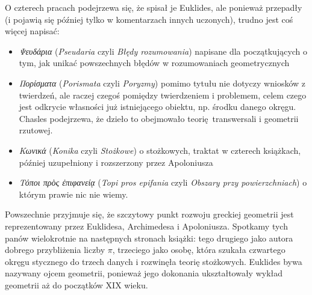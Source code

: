 O czterech pracach podejrzewa się, że spisał je Euklides, ale ponieważ przepadły (i pojawią się później tylko w komentarzach innych uczonych), trudno jest coś więcej napisać:
\begin{itemize}
\item \emph{Ψευδάρια} (\emph{Pseudaria} czyli \emph{Błędy rozumowania}) napisane dla początkujących o tym, jak unikać powszechnych błędów w rozumowaniach geometrycznych
\item \emph{Πορίσματα} (\emph{Porismata} czyli \emph{Poryzmy}) pomimo tytułu nie dotyczy wniosków z twierdzeń, ale raczej czegoś pomiędzy twierdzeniem i problemem, celem czego jest odkrycie własności już istniejącego obiektu, np. środku danego okręgu.
Chasles podejrzewa, że dzieło to obejmowało teorię transwersali i geometrii rzutowej.
%
\item \emph{Κωνικά} (\emph{Konika} czyli \emph{Stożkowe}) o stożkowych, traktat w czterech książkach, później uzupełniony i rozszerzony przez Apoloniusza
\item \emph{Τόποι πρὸς ἐπιφανείᾳ} (\emph{Topi pros epifania} czyli \emph{Obszary przy powierzchniach}) o którym prawie nic nie wiemy.
\end{itemize}

Powszechnie przyjmuje się, że szczytowy punkt rozwoju greckiej geometrii jest reprezentowany przez Euklidesa, Archimedesa i Apoloniusza.
Spotkamy tych panów wielokrotnie na następnych stronach książki: tego drugiego jako autora dobrego przybliżenia liczby $\pi$, trzeciego jako osobę, która szukała czwartego okręgu stycznego do trzech danych i rozwinęła teorię stożkowych.
Euklides bywa nazywany ojcem geometrii, ponieważ jego dokonania ukształtowały wykład geometrii aż do początków XIX wieku.


